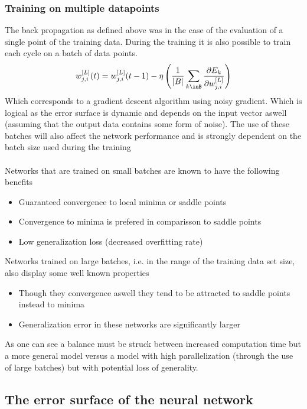 \documentclass[12pt]{article}
\begin{document}
\subsubsection{Training on multiple datapoints}
The back propagation as defined above was in the case of the evaluation of a single point of the training data. During the training it is also possible to train each cycle on a batch of data points. 
\begin{equation}
w_{j,i}^{[L]}(t) = w_{j,i}^{[L]}(t-1) - \eta\left(\frac{1}{\lvert B\rvert}\sum_{k\inB} \frac{\partial E_k}{\partial w_{j,i}^{[L]} }\right)
\end{equation}
Which corresponds to a gradient descent algorithm using noisy gradient\cite{Keskar2016}. Which is logical as the error surface is dynamic and depends on the input vector aswell (assuming that the output data contains some form of noise). The use of these batches will also affect the network performance and is strongly dependent on the batch size used during the training
\\
\\
Networks that are trained on small batches are known to have the following benefits \cite{Smith2017}\cite{Keskar2016}
\begin{itemize}
	\item Guaranteed convergence to local minima or saddle points
	\item Convergence to minima is prefered in comparisson to saddle points
	\item Low generalization loss (decreased overfitting rate)
\end{itemize} 
Networks trained on large batches, i.e. in the range of the training data set size, also display some well known properties\cite{Smith2017}\cite{Keskar2016}
\begin{itemize}
	\item Though they convergence aswell they tend to be attracted to saddle points instead to minima
	\item Generalization error in these networks are significantly larger
\end{itemize}
As one can see a balance must be struck between increased computation time but a more general model versus a model with high parallelization (through the use of large batches) but with potential loss of generality.

\subsection{The error surface of the neural network}
\end{document}
